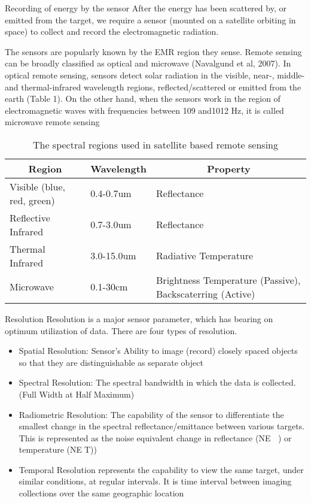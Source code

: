 \documentclass[10pt]{beamer}
\begin{document}
\begin{frame}{Recording of energy by the sensor}
  After the energy has been scattered by, or emitted from the target, we require a sensor
(mounted on a satellite orbiting in space) to collect and record the electromagnetic radiation.

The sensors are popularly known by the EMR region they sense. Remote sensing can be
broadly classified as optical and microwave (Navalgund et al, 2007). In optical remote
sensing, sensors detect solar radiation in the visible, near-, middle- and thermal-infrared
wavelength regions, reflected/scattered or emitted from the earth (Table 1). On the other
hand, when the sensors work in the region of electromagnetic waves with frequencies
between 109 and1012 Hz, it is called microwave remote sensing

\begin{table}
  \caption{The spectral regions used in satellite based remote sensing}\label{tab:spectral_regions}
  \begin{center}
    \begin{tabular}[c]{l|l|l}
      \hline
      \multicolumn{1}{c|}{\textbf{Region}} & 
      \multicolumn{1}{c}{\textbf{Wavelength}} &
      \multicolumn{1}{c}{\textbf{Property}} \\
      \hline
      Visible (blue, red, green) & 0.4-0.7um & Reflectance \\      
      Reflective Infrared & 0.7-3.0um & Reflectance \\
      Thermal Infrared & 3.0-15.0um & Radiative Temperature \\
      Microwave & 0.1-30cm & Brightness Temperature (Passive), Backscaterring (Active)
      \hline
    \end{tabular}
  \end{center}
\end{table}
\end{frame}
\begin{frame}{Resolution}
  Resolution is a major sensor parameter, which has bearing on optimum utilization of data.
  There are four types of resolution.

  \begin{itemize}
    \item Spatial Resolution: Sensor’s Ability to image (record) closely spaced objects so that
they are distinguishable as separate object
    \item Spectral Resolution: The spectral bandwidth in which the data is collected.
(Full Width at Half Maximum)
    \item Radiometric Resolution: The capability of the sensor to differentiate the smallest
change in the spectral reflectance/emittance between various targets. This is
represented as the noise equivalent change in reflectance (NE ) or temperature
(NET))
    \item Temporal Resolution represents the capability to view the same target, under similar
conditions, at regular intervals. It is time interval between imaging collections over
the same geographic location
  \end{itemize}
\end{frame}
\end{document}
